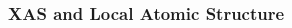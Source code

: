 \documentclass[10pt, xcolor=x11names, compress]{beamer}
\begin{document}
\begin{frame}
  \frametitle{XAS and Local Atomic Structure}
  \begin{columns}[T]
    \begin{column}{0.34\linewidth}



\end{column}
\end{columns}
\end{frame}
\end{document}
